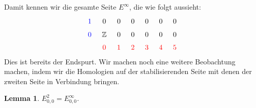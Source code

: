 \documentclass[12pt]{article}
\numberwithin{conj}{section}
\newtheorem{lemma}[conj]{Lemma}
\begin{document}
    Damit kennen wir die gesamte Seite $E^{\infty}$, die wie folgt aussieht:
    \[
        \begin{tikzcd}
            [sep=tiny] {\color{blue}1} & 0 & 0 & 0 & 0 & 0 & 0 \\ {\color{blue}0} & {\mathbb{Z}}
            & 0 & 0 & 0 & 0 & 0 \\ & {\color{red}0} & {\color{red}1} & {\color{red}2} &
            {\color{red}3} & {\color{red}4} & {\color{red}5}
        \end{tikzcd}
    \]
    Dies ist bereits der Endspurt. Wir machen noch eine weitere Beobachtung machen, indem
    wir die Homologien auf der stabilisierenden Seite mit denen der zweiten Seite in
    Verbindung bringen.
    \begin{lemma}
        \label{E2}
        $E^{2}_{0,0}= E^{\infty}_{0,0}$.
    \end{lemma}
\end{document}
